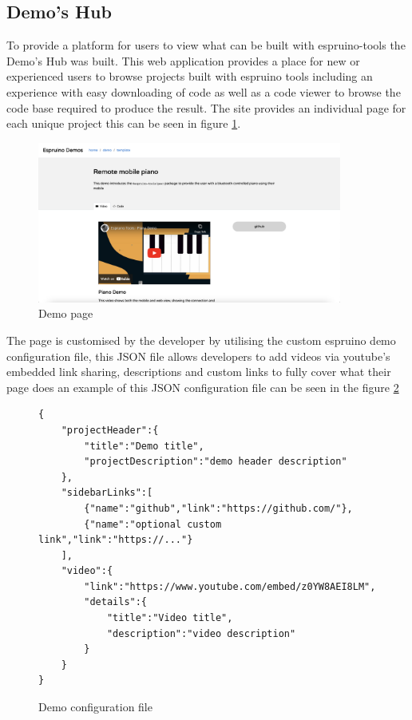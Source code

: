 \documentclass{l4proj}
\begin{document}
\subsection{Demo's Hub}
To provide a platform for users to view what can be built with espruino-tools the Demo's Hub was built. This web application provides a place for new or experienced users to browse projects built with espruino tools including an experience with easy downloading of code as well as a code viewer to browse the code base required to produce the result. The site provides an individual page for each unique project this can be seen in figure \ref{fig:demo-page}.

\begin{figure}[!ht]
    \centering
    \includegraphics[width=10cm]{dissertation/images/demo-page.png}
    \caption{Demo page}
    \label{fig:demo-page}
\end{figure}

The page is customised by the developer by utilising the custom espruino demo configuration file, this JSON file allows developers to add videos via youtube's embedded link sharing, descriptions and custom links to fully cover what their page does an example of this JSON configuration file can be seen in the figure \ref{fig:demo-config}

\begin{figure}[!ht]
    \centering
    \begin{lstlisting}
{
    "projectHeader":{
        "title":"Demo title",
        "projectDescription":"demo header description"
    },
    "sidebarLinks":[
        {"name":"github","link":"https://github.com/"},
        {"name":"optional custom link","link":"https://..."}
    ],
    "video":{
        "link":"https://www.youtube.com/embed/z0YW8AEI8LM",
        "details":{
            "title":"Video title",
            "description":"video description"
        }
    }
}
    \end{lstlisting}
    \caption{Demo configuration file}
    \label{fig:demo-config}
\end{figure}
\end{document}
